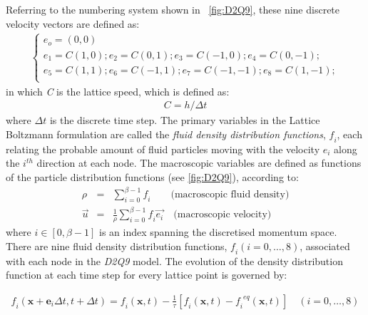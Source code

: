 Referring to the numbering system shown in ~\cref{fig:D2Q9}, these nine discrete velocity vectors are defined as:
\begin{eqnarray} 
\begin{cases}
\mathit{e_o}=(0,0)\\
\mathit{e_1}=\mathit{C}(1,0); \mathit{e_2}=\mathit{C}(0,1); \mathit{e_3}=\mathit{C}(-1,0); \mathit{e_4}=\mathit{C}(0,-1); \\
\mathit{e_5}=\mathit{C}(1,1); \mathit{e_6}=\mathit{C}(-1,1); \mathit{e_7}=\mathit{C}(-1,-1); \mathit{e_8}=\mathit{C}(1,-1); \\ 
\end{cases}
\end{eqnarray}
in which \textit{C} is the lattice speed, which is defined as:
\begin{eqnarray}
\mathit{C}=\mathit{h}/\Delta t
\end{eqnarray}
where $\Delta \mathit{t}$ is the discrete time step. The primary variables in the Lattice Boltzmann formulation are called the \textit{fluid density distribution functions}, $\mathit{f_i}$, each relating the probable amount of fluid particles moving with the velocity $\mathit{e_i}$ along the $\mathit{i^{th}}$ direction at each node. The macroscopic variables are defined as functions of the particle distribution functions (see \cref{fig:D2Q9}), according to:
\begin{eqnarray} 
 \nonumber
\rho & = & \sum\limits_{\mathit{i}=0}^{\beta - 1}{\mathit{f_i}} \qquad \mbox{(macroscopic fluid density)} \\
\overrightarrow{\mathit{u}} & = & \frac{1}{\rho} \sum\limits_{\mathit{i}=0}^{\beta -1}{\mathit{f_i}\overrightarrow{\mathit{e_i}}} \quad \mbox{(macroscopic velocity)}
\label{eq:lbm_macroscopic}
\end{eqnarray} 
where $\mathit{i} \in [0, \beta -1]$ is an index spanning the discretised momentum space. There are nine fluid density distribution functions, $\mathit{f_i}(\mathit{i}=0,\dots,8)$, associated with each node in the \textit{D2Q9} model. The evolution of the density distribution function at each time step for every lattice point is governed by:

\begin{eqnarray} 
\label{eq:stream}
\mathit{f_i}(\mathbf{x}+\mathbf{e}_{\mathit{i}} \Delta t, t + \Delta t) = \mathit{f_i}(\mathbf{x},t) - \frac{1}{\tau} [\mathit{f_i}(\mathbf{x},t) -\mathit{f_i}^{\mathit{eq}}(\mathbf{x},t)] \quad (\mathit{i}=0,\dots,8)
\end{eqnarray}

